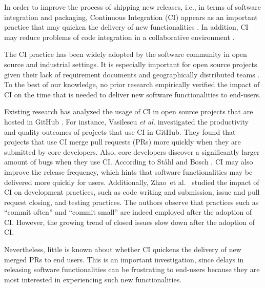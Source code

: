 	In order to improve the process of shipping new releases, i.e., in terms of
	software integration and packaging, Continuous Integration (CI) appears as an
	important practice that may quicken the delivery of new functionalities
	\cite{Laukkanen2015-ab}. In addition, CI may reduce problems of code
	integration in a collaborative environment \cite{Vasilescu2015-tj}.
	
	The CI practice has been widely adopted by the software community
	\cite{Duvall2007-tb} in open source and industrial settings. It is
	especially important for open source projects given their lack of requirement
	documents and geographically distributed teams \cite{Vasilescu2015-tj}. To the
	best of our knowledge, no prior research empirically verified the impact
	of CI on the time that is needed to deliver new software functionalities to
	end-users.
	
	Existing research has analyzed the usage of CI in open source projects that are
	hosted in GitHub \cite{Hilton2016-xy,Vasilescu2015-tj,Vasilescu2015-tn}. For
	instance, Vasilescu \textit{et al.} \cite{Vasilescu2015-tn} investigated the
	productivity and quality outcomes of projects that use CI in GitHub. They found
	that projects that use CI merge pull requests (PRs) more quickly when they are
	submitted by core developers. Also, core developers discover a significantly
	larger amount of bugs when they use CI. According to St{\aa}hl and Bosch
	\cite{Stahl:2014:MCI:2562355.2562828}, CI may also improve the release
	frequency, which hints that software functionalities may be delivered more
	quickly for users. Additionally, Zhao~et al.~\cite{zhao2017impact} studied the
	impact of CI on development practices, such as code writing and submission,
	issue and pull request closing, and testing practices. The authors observe that
	practices such as ``commit often'' and ``commit small'' are indeed employed
	after the adoption of CI. However, the growing trend of closed issues slow down
	after the adoption of CI.
	
	Nevertheless, little is known about whether CI quickens the delivery of new
	merged PRs to end users. This is an important investigation, since delays in
	releasing software functionalities can be frustrating to end-users because they
	are most interested in experiencing such new functionalities. 
	
	
